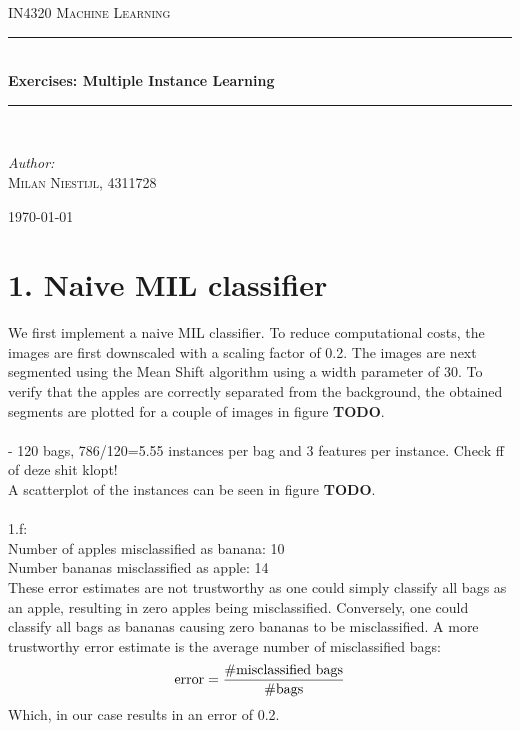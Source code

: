 \documentclass [a4paper] {report}
\begin{document}
	
	\begin{titlepage}
		\begin{center}
			
			\textsc{\LARGE IN4320 Machine Learning}\\[1.25cm]
			
			\rule{\linewidth}{0.5mm}\\[1.0cm]
			{\huge \bfseries Exercises: Multiple Instance Learning }\\[0.6cm]
			\rule{\linewidth}{0.5mm}\\[1.5cm]
			
			\begin{minipage}{0.4\textwidth}
				\begin{flushleft} \large	
					\emph{Author:}\\
					\textsc{Milan Niestijl, 4311728}
				\end{flushleft}
			\end{minipage}
			
			\vfill
			{\large \today}
		\end{center}
	\end{titlepage}
	
	\section*{1. Naive MIL classifier}
	We first implement a naive MIL classifier. To reduce computational costs, the images are first downscaled with a scaling factor of 0.2. The images are next segmented using the Mean Shift algorithm using a width parameter of 30. To verify that the apples are correctly separated from the background, the obtained segments are plotted for a couple of images in figure \textbf{TODO}.\\\\
	- 120 bags, 786/120=5.55 instances per bag and 3 features per instance. Check ff of deze shit klopt!\\
	A scatterplot of the instances can be seen in figure \textbf{TODO}.\\\\
	
	1.f:\\
	
	Number of apples misclassified as banana: 10\\
	Number bananas misclassified as apple: 14\\
	These error estimates are not trustworthy as one could simply classify all bags as an apple, resulting in zero apples being misclassified. Conversely, one could classify all bags as bananas causing zero bananas to be misclassified. A more trustworthy error estimate is the average number of misclassified bags:
	$$ \text{error} = {\#\text{misclassified bags}\over \#\text{bags}} $$
	Which, in our case results in an error of 0.2.\\
	
\end{document}
